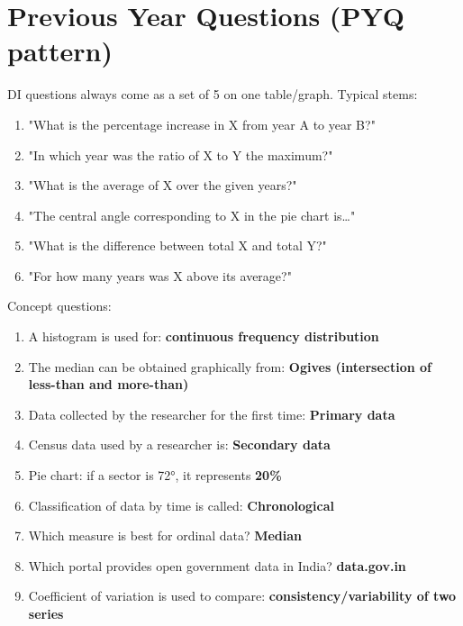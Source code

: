 \needspace{125pt}

\hypertarget{p1-07--previous-year-questions-pyq-pattern}{%
\section{Previous Year Questions (PYQ pattern)}\label{p1-07--previous-year-questions-pyq-pattern}}

DI questions always come as a set of 5 on one table/graph. Typical stems:

\begin{enumerate}
\def\labelenumi{\arabic{enumi}.}
\tightlist
\item
  "What is the percentage increase in X from year A to year B?"
\item
  "In which year was the ratio of X to Y the maximum?"
\item
  "What is the average of X over the given years?"
\item
  "The central angle corresponding to X in the pie chart is\ldots"
\item
  "What is the difference between total X and total Y?"
\item
  "For how many years was X above its average?"
\end{enumerate}

Concept questions:

\begin{enumerate}
\def\labelenumi{\arabic{enumi}.}
\setcounter{enumi}{6}
\tightlist
\item
  A histogram is used for: \textbf{continuous frequency distribution}
\item
  The median can be obtained graphically from: \textbf{Ogives (intersection of less-than and more-than)}
\item
  Data collected by the researcher for the first time: \textbf{Primary data}
\item
  Census data used by a researcher is: \textbf{Secondary data}
\item
  Pie chart: if a sector is 72°, it represents \textbf{20\%}
\item
  Classification of data by time is called: \textbf{Chronological}
\item
  Which measure is best for ordinal data? \textbf{Median}
\item
  Which portal provides open government data in India? \textbf{data.gov.in}
\item
  Coefficient of variation is used to compare: \textbf{consistency/variability of two series}
\end{enumerate}

